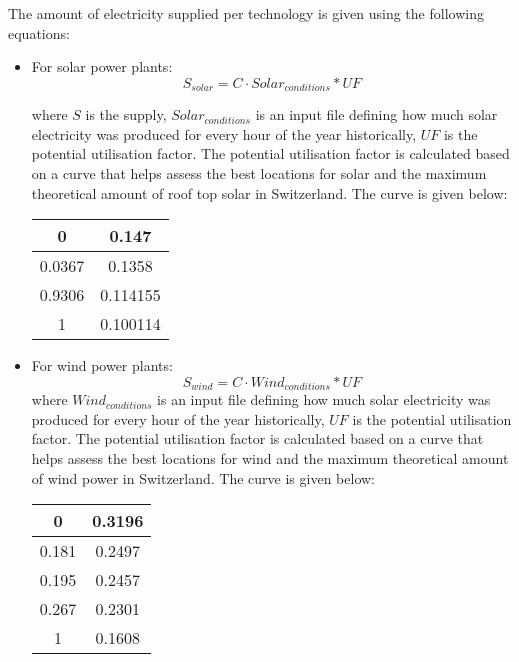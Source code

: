 The amount of electricity supplied per technology is given using the following equations:

\begin{itemize}

\item For solar power plants:
\begin{equation}
S_{solar} = C \cdot Solar_{conditions} * UF
\end{equation}

where $S$ is the supply, $Solar_{conditions}$ is an input file defining how much solar electricity was produced for every hour of the year historically, $UF$ is the potential utilisation factor. The potential utilisation factor is calculated based on a curve that helps assess the best locations for solar and the maximum theoretical amount of roof top solar in Switzerland. The curve is given below:

\begin{center}
\begin{tabular}{ |c|c| } 
\hline
0		& 0.147 \\ \hline
0.0367	& 0.1358  \\ \hline
0.9306	& 0.114155  \\ \hline
1		& 0.100114  \\
 \hline
\end{tabular}
\end{center}

\item For wind power plants:
\begin{equation}
S_{wind} = C \cdot Wind_{conditions} * UF
\end{equation}
where $Wind_{conditions}$ is an input file defining how much solar electricity was produced for every hour of the year historically, $UF$ is the potential utilisation factor. The potential utilisation factor is calculated based on a curve that helps assess the best locations for wind and the maximum theoretical amount of wind power in Switzerland. The curve is given below:

\begin{center}
\begin{tabular}{ |c|c| } 
\hline
0		& 0.3196 \\ \hline
0.181	& 0.2497  \\ \hline
0.195	& 0.2457  \\ \hline
0.267	& 0.2301  \\ \hline
1		& 0.1608 \\ 
 \hline
\end{tabular}
\end{center}


\end{itemize}
